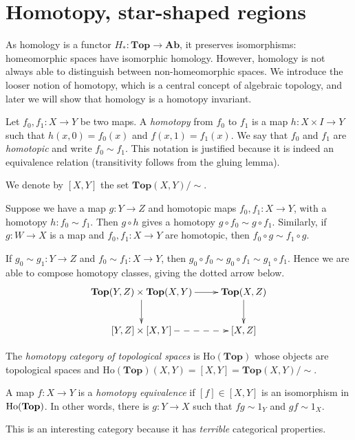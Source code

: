 \section{Homotopy, star-shaped regions}
As homology is a functor $H_\ast:\mathbf{Top}\to\mathbf{Ab}$, it preserves isomorphisms: homeomorphic spaces have isomorphic homology. However, homology is not always able to distinguish between non-homeomorphic spaces. We introduce the looser notion of homotopy, which is a central concept of algebraic topology, and later we will show that homology is a homotopy invariant.
\begin{definition}
Let $f_0,f_1:X\to Y$ be two maps. A \emph{homotopy} from $f_0$ to $f_1$ is a map $h:X\times I\to Y$ such that $h(x,0)=f_0(x)$ and $f(x,1)=f_1(x)$. We say that $f_0$ and $f_1$ are \emph{homotopic} and write $f_0\sim f_1$.  This notation is justified because it is indeed an equivalence relation (transitivity follows from the gluing lemma).
\end{definition}
We denote by $[X,Y]$ the set $\mathbf{Top}(X,Y)/\sim$.

Suppose we have a map $g: Y\to Z$ and homotopic maps $f_0,f_1:X\to Y$, with a homotopy $h:f_0\sim f_1$. Then $g\circ h$ gives a homotopy $g\circ f_0 \sim g\circ f_1$. Similarly, if $g:W\to X$ is a map and $f_0,f_1:X\to Y$ are homotopic, then $f_0\circ g\sim f_1\circ g$.

If $g_0\sim g_1:Y\to Z$ and $f_0\sim f_1: X\to Y$, then $g_0\circ f_0\sim g_0 \circ f_1\sim g_1 \circ f_1$. Hence we are able to compose homotopy classes, giving the dotted arrow below.
\begin{equation*}
\xymatrix{\mathbf{Top}(Y,Z)\times\mathbf{Top}(X,Y)\ar[d]\ar[r] & \mathbf{Top}(X,Z)\ar[d]\\
[Y,Z]\times[X,Y]\ar@{-->}[r] & [X,Z]}
\end{equation*}

\begin{definition}
The \emph{homotopy category of topological spaces} is $\mathrm{Ho}(\mathbf{Top})$ whose objects are topological spaces and $\mathrm{Ho}(\mathbf{Top})(X,Y)=[X,Y]=\mathbf{Top}(X,Y)/\sim$.
\end{definition}
\begin{definition}
	A map $f:X\to Y$ is a \emph{homotopy equivalence} if $[f]\in[X,Y]$ is an isomorphism in $\mathrm{Ho}(\mathbf{Top})$. In other words, there is $g:Y\to X$ such that $fg\sim 1_Y$ and $gf\sim 1_X$.
\end{definition}
This is an interesting category because it has \textit{terrible} categorical properties.

